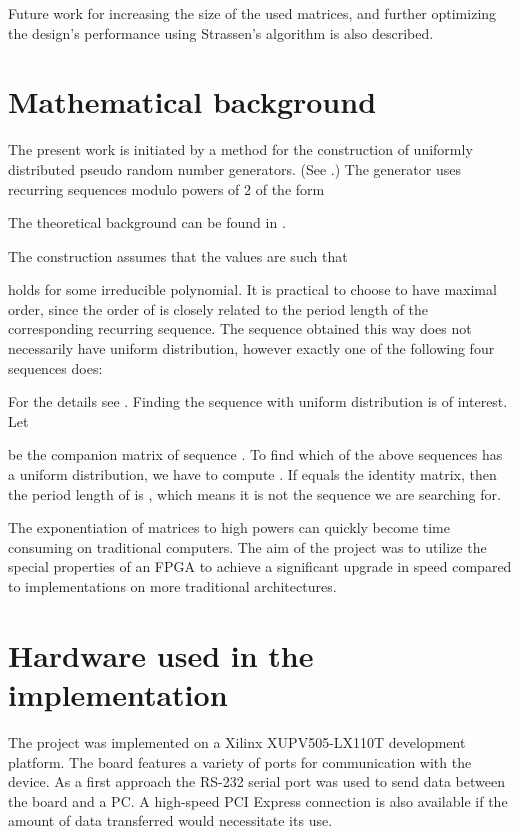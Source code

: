 \documentclass[11pt,twoside]{article}
\begin{document}
Future work for increasing the size of the used matrices, and further optimizing the design's performance using Strassen's algorithm is also described.

\section{Mathematical background}

The present work is initiated by a method for the construction of uniformly distributed pseudo random number generators. (See \cite{c7}.) The generator uses recurring sequences modulo powers of 2 of the form

The theoretical background can be found in \cite{c6}.

The construction assumes that the values  are such that

holds for some  irreducible polynomial. It is practical to choose  to have maximal order, since the order of  is closely related to the period length of the corresponding recurring sequence.
The sequence  obtained this way does not necessarily have uniform distribution, however exactly one of the following four sequences does:

For the details see \cite{c7}. Finding the sequence with uniform distribution is of interest. 
Let


be the companion matrix of sequence . To find which of the above sequences has a uniform distribution, we have to compute . If  equals the identity matrix, then the period length of  is , which means it is not the sequence we are searching for.

The exponentiation of matrices to high powers can quickly become time consuming on traditional computers. The aim of the project was to utilize the special properties of an FPGA to achieve a significant upgrade in speed compared to implementations on more traditional architectures.

\section{Hardware used in the implementation}

The project was implemented on a Xilinx XUPV505-LX110T development platform. The board features a variety of ports for communication with the device. As a first approach the RS-232 serial port was used to send data between the board and a PC. A high-speed PCI Express connection is also available if the amount of data transferred would necessitate its use.
\end{document}
